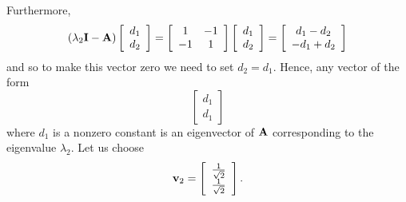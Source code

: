 \begin{solution}
\begin{enumerate}
Furthermore,
\[
\left(\lambda_2{\bf I}-{\bf A}\right)\left[\begin{array}{c}d_1 \\ d_2\end{array}\right]=\left[\begin{array}{cc}1 & -1\\-1 & 1\end{array}\right]\left[\begin{array}{c}d_1 \\ d_2\end{array}\right]=\left[\begin{array}{c}d_1-d_2 \\ -d_1+d_2\end{array}\right]
\]
and so to make this vector zero we need to set $d_2=d_1$. Hence, any vector of the form
\[
\left[\begin{array}{c}d_1 \\ d_1\end{array}\right]
\]
where $d_1$ is a nonzero constant is an eigenvector of ${\bf A}$ corresponding to the eigenvalue $\lambda_2$. Let us choose
\[
{\bf v}_2=\left[\begin{array}{c}{1\over\sqrt{2}} \\ {1\over\sqrt{2}}\end{array}\right].
\]


\end{enumerate}
\end{solution}
